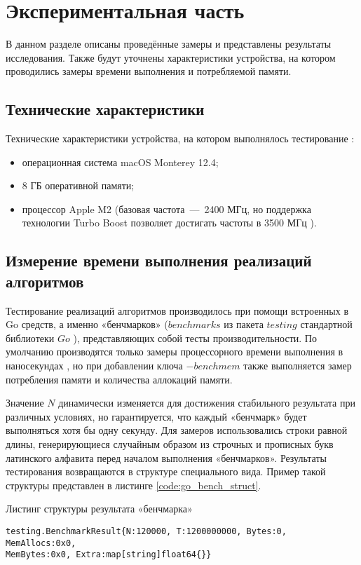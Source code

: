 \chapter{Экспериментальная часть}

В данном разделе описаны проведённые замеры и представлены результаты исследования. Также будут уточнены характеристики устройства, на котором проводились замеры времени выполнения и потребляемой памяти.

\section{Технические характеристики}
Технические характеристики устройства, на котором выполнялось тестирование \cite{web_item5}:
\begin{itemize}
	\item операционная система macOS Monterey 12.4;
	\item 8 ГБ оперативной памяти;
	\item процессор Apple M2 (базовая частота~---~2400 МГц, но поддержка технологии Turbo Boost позволяет достигать частоты в 3500 МГц \cite{web_item10}).
\end{itemize}

\section{Измерение времени выполнения реализаций алгоритмов}
Тестирование реализаций алгоритмов производилось при помощи встроенных в Go средств, а именно «бенчмарков» ($benchmarks$ из пакета $testing$ стандартной библиотеки $Go$ \cite{web_item3}), представляющих собой тесты производительности. По умолчанию производятся только замеры процессорного времени выполнения в наносекундах \cite{web_item11}\cite{web_item12}, но при добавлении ключа $-benchmem$ также выполняется замер потребления памяти и количества аллокаций памяти.

Значение $N$ динамически изменяется для достижения стабильного результата при различных условиях, но гарантируется, что каждый «бенчмарк» будет выполняться хотя бы одну секунду. Для замеров использовались строки равной длины, генерирующиеся  случайным образом из строчных и прописных букв латинского алфавита перед началом выполнения «бенчмарков». Результаты тестирования возвращаются в структуре специального вида. Пример такой структуры представлен в листинге \ref{code:go_bench_struct}.

\newpage

\begin{code}
\caption{Листинг структуры результата «бенчмарка»}
\label{code:go_bench_struct}

\begin{verbatim}
testing.BenchmarkResult{N:120000, T:1200000000, Bytes:0, MemAllocs:0x0, 
MemBytes:0x0, Extra:map[string]float64{}}
\end{verbatim}
\end{code}

